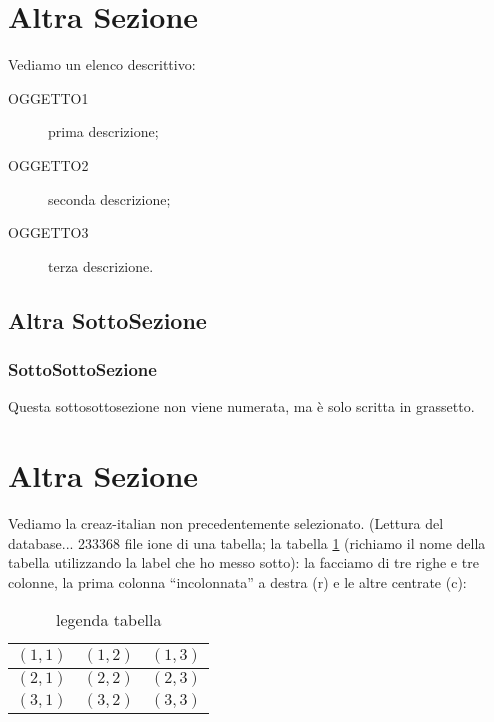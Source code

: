\documentclass[12pt,a4paper,openright,twoside]{report}
\begin{document}
\section{Altra Sezione}
Vediamo un elenco descrittivo:
\begin{description}                     %
  \item[OGGETTO1] prima descrizione;
  \item[OGGETTO2] seconda descrizione;
  \item[OGGETTO3] terza descrizione.
\end{description}
\subsection{Altra SottoSezione}
\subsubsection{SottoSottoSezione}Questa sottosottosezione non viene
numerata, ma \`e solo scritta in grassetto.
\section{Altra Sezione}                 %
Vediamo la creaz-italian non precedentemente selezionato.
(Lettura del database... 233368 file ione di una tabella; la tabella \ref{tab:uno}
(richiamo il nome della tabella utilizzando la label che ho messo sotto):
la facciamo di tre righe e tre colonne, la prima colonna
``incolonnata'' a destra (r) e le altre centrate (c):\\
\begin{table}[h]                        %
\begin{center}                          %
\begin{tabular}{r|c|c}                  %
\hline \hline                           %
$(1,1)$ & $(1,2)$ & $(1,3)$\\           %
\hline                                  %
$(2,1)$ & $(2,2)$ & $(2,3)$\\           %
\hline                                  %
$(3,1)$ & $(3,2)$ & $(3,3)$\\
\hline \hline                           %
\end{tabular}
\caption[legenda elenco tabelle]{legenda tabella}\label{tab:uno}
\end{center}
\end{table}
\end{document}
